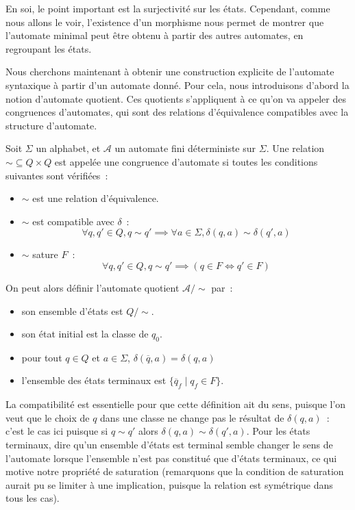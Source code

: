 \begin{remark}
  En soi, le point important est la surjectivité sur les états. Cependant, comme
  nous allons le voir, l'existence d'un morphisme nous permet de montrer que
  l'automate minimal peut être obtenu à partir des autres automates, en
  regroupant les états.
\end{remark}

Nous cherchons maintenant à obtenir une construction explicite de l'automate
syntaxique à partir d'un automate donné. Pour cela, nous introduisons d'abord la
notion d'automate quotient. Ces quotients s'appliquent à ce qu'on va appeler des
congruences d'automates, qui sont des relations d'équivalence compatibles avec
la structure d'automate.

\begin{definition}
  Soit $\Sigma$ un alphabet, et $\mathcal A$ un automate fini déterministe sur
  $\Sigma$. Une relation $\sim \subseteq Q \times Q$ est appelée une congruence
  d'automate si toutes les conditions suivantes sont vérifiées~:
  \begin{itemize}
  \item $\sim$ est une relation d'équivalence.
  \item $\sim$ est compatible avec $\delta$~:
    \[\forall q,q' \in Q, q \sim q' \implies \forall a \in \Sigma,
    \delta(q,a) \sim \delta(q',a)\]
  \item $\sim$ sature $F$~:
    \[\forall q,q' \in Q, q \sim q' \implies (q \in F \iff q' \in F)\]
  \end{itemize}

  On peut alors définir l'automate quotient $\mathcal A/\sim$ par~:
  \begin{itemize}
  \item son ensemble d'états est $Q/\sim$.
  \item son état initial est la classe de $q_0$.
  \item pour tout $q \in Q$ et $a \in \Sigma$,
    $\delta(\overline q,a) =\delta(q,a)$
  \item l'ensemble des états terminaux est $\{\overline q_f \mid q_f \in F\}$.
  \end{itemize}
\end{definition}

\begin{remark}
  La compatibilité est essentielle pour que cette définition ait du sens,
  puisque l'on veut que le choix de $q$ dans une classe ne change pas le
  résultat de $\delta(q,a)$~: c'est le cas ici puisque si $q\sim q'$ alors
  $\delta(q,a) \sim \delta(q',a)$. Pour les états terminaux, dire qu'un ensemble
  d'états est terminal semble changer le sens de l'automate lorsque l'ensemble
  n'est pas constitué que d'états terminaux, ce qui motive notre propriété de
  saturation (remarquons que la condition de saturation aurait pu se limiter à
  une implication, puisque la relation est symétrique dans tous les cas).
\end{remark}

